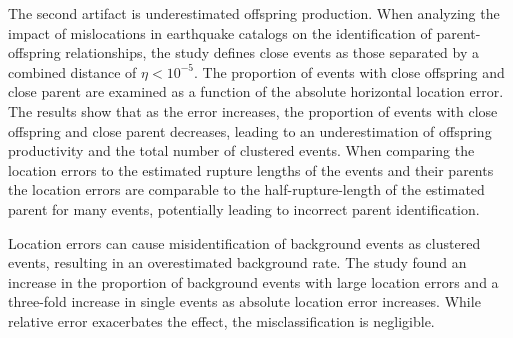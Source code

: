 \documentclass[12pt]{article} %
\theoremstyle{plain}
\begin{document}
	The second artifact is underestimated offspring production. When analyzing the impact of mislocations in earthquake catalogs on the identification of parent-offspring relationships, the study defines close events as those separated by a combined distance of $\eta < 10^{-5}$. The proportion of events with close offspring and close parent are examined as a function of the absolute horizontal location error. The results show that as the error increases, the proportion of events with close offspring and close parent decreases, leading to an underestimation of offspring productivity and the total number of clustered events. When comparing the location errors to the estimated rupture lengths of the events and their parents the location errors are comparable to the half-rupture-length of the estimated parent for many events, potentially leading to incorrect parent identification.
	
	Location errors can cause misidentification of background events as clustered events, resulting in an overestimated background rate. The study found an increase in the proportion of background events with large location errors and a three-fold increase in single events as absolute location error increases. While relative error exacerbates the effect, the misclassification is negligible.
	
\end{document}
